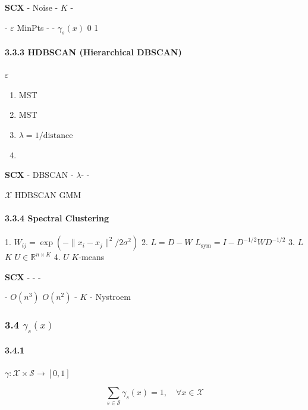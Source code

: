 \documentclass[
  12pt,
]{article}
\providecommand{\tightlist}{%
  \setlength{\itemsep}{0pt}\setlength{\parskip}{0pt}}
\begin{document}
\textbf{SCX } - Noise  - 
\(K\) - 

\textbf{} - \(\varepsilon\)  MinPts  -
 -  \(\gamma_s(x)\) 0 
1

\paragraph{3.3.3 HDBSCAN (Hierarchical
DBSCAN)}\label{hdbscan-hierarchical-dbscan}

\textbf{} \(\varepsilon\) 

\begin{enumerate}
\def\labelenumi{\arabic{enumi}.}
\tightlist
\item
  MST
\item
   MST 
\item
   \(\lambda = 1/\text{distance}\) 
\item
  
\end{enumerate}

\textbf{SCX } -  DBSCAN -
 \(\lambda\)- -


\textbf{} \(\mathcal{X}\) HDBSCAN  GMM


\paragraph{3.3.4 Spectral Clustering}\label{spectral-clustering}

\textbf{} 1. 
\(W_{ij} = \exp(-\|x_i - x_j\|^2 / 2\sigma^2)\) 2. 
\(L = D - W\) 
\(L_{\text{sym}} = I - D^{-1/2} W D^{-1/2}\) 3.  \(L\)  \(K\)
 \(U \in \mathbb{R}^{n \times K}\) 4.  \(U\)
 \(K\)-means

\textbf{SCX } -  -
 - 

\textbf{} - \(O(n^3)\)  \(O(n^2)\) - \(K\)
 -  Nystroem 

\subsubsection{\texorpdfstring{3.4 
\(\gamma_s(x)\)}{3.4  \textbackslash gamma\_s(x)}}\label{ux8f6fux72b6ux6001ux8d4bux503c-gamma_sx}

\paragraph{3.4.1 }\label{ux5b9aux4e49}

 \(\gamma: \mathcal{X} \times \mathcal{S} \to [0,1]\)


\[\sum_{s \in \mathcal{S}} \gamma_s(x) = 1, \quad \forall x \in \mathcal{X}\]
\end{document}
